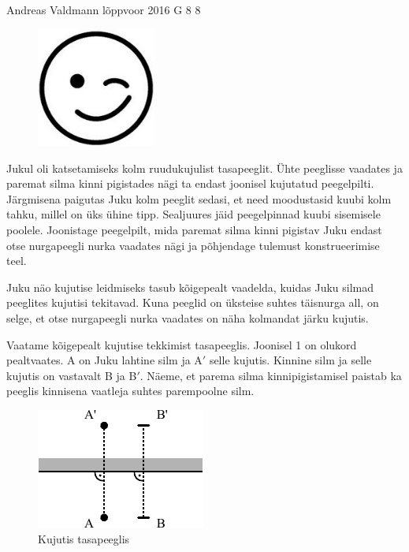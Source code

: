 {Andreas Valdmann} %
{lõppvoor} %
{2016} %
{G 8} %
{8} %
{
\ifStatement
\begin{figure}
	\vspace{-25pt}
	\begin{center}
		\includegraphics[width=0.35\textwidth]{2016-v3g-08-wink.png}
	\end{center}
	\vspace{-20pt}
\end{figure}

Jukul oli katsetamiseks kolm ruudukujulist tasapeeglit. Ühte peeglisse vaadates ja paremat silma kinni pigistades nägi ta endast joonisel kujutatud peegelpilti. Järgmisena paigutas Juku kolm peeglit sedasi, et need moodustasid kuubi kolm tahku, millel on üks ühine tipp. Sealjuures jäid peegelpinnad kuubi sisemisele poolele. Joonistage peegelpilt, mida paremat silma kinni pigistav Juku endast otse nurgapeegli nurka vaadates nägi ja põhjendage tulemust konstrueerimise teel.
\fi


\ifHint
Juku näo kujutise leidmiseks tasub kõigepealt vaadelda, kuidas Juku silmad peeglites kujutisi tekitavad. Kuna peeglid on üksteise suhtes täisnurga all, on selge, et otse nurgapeegli nurka vaadates on näha kolmandat järku kujutis.
\fi


\ifSolution
Vaatame kõigepealt kujutise tekkimist tasapeeglis. Joonisel 1 on olukord pealtvaates. A on Juku lahtine silm ja A$'$ selle kujutis. Kinnine silm  ja selle kujutis on vastavalt B ja B$'$. Näeme, et parema silma kinnipigistamisel paistab ka peeglis kinnisena vaatleja suhtes parempoolne silm.
\begin{figure}[h]
	\centerline{\includegraphics[scale=1.2]{2016-v3g-08-nurgapeegel_j1}}
	\caption{Kujutis tasapeeglis}
\end{figure}

}
